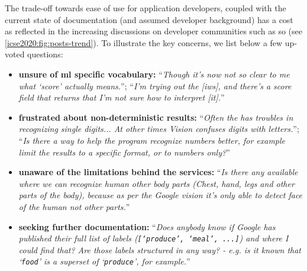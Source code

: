 The trade-off towards ease of use for application developers, coupled with the current state of documentation (and assumed developer background) has a cost as reflected in the increasing discussions on developer communities such as \gls{so} (see \cref{icse2020:fig:posts-trend}). To illustrate the key concerns, we list below a few up-voted questions:

\begin{itemize}
  \item \textbf{unsure of \gls{ml} specific vocabulary:} ``\textit{Though it's now not \gls{so} clear to me what `score' actually means.}''; ``\textit{I'm trying out the [\gls{iws}], and there's a score field that returns that I'm not sure how to interpret [it].}''
  \item \textbf{frustrated about non-deterministic results:} ``\textit{Often the  has troubles in recognizing single digits... At other times Vision confuses digits with letters.}''; ``\textit{Is there a way to help the program recognize numbers better, for example limit the results to a specific format, or to numbers only?}''
  \item \textbf{unaware of the limitations behind the services:} ``\textit{Is there any  available where we can recognize human other body parts (Chest, hand, legs and other parts of the body), because as per the Google vision  it's only able to detect face of the human not other parts.}''
  \item \textbf{seeking further documentation:} ``\textit{Does anybody know if Google has published their full list of labels (\texttt{[`produce', `meal', ...]}) and where I could find that? Are those labels structured in any way? - e.g. is it known that `\texttt{food}' is a superset of `\texttt{produce}', for example.}''
\end{itemize}


